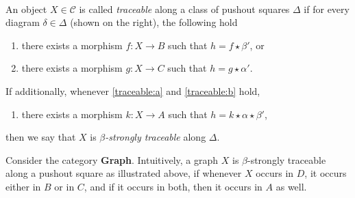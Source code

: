 \begin{definition}
    \label{def:traceability}
    \ \newline
\noindent 
\begin{minipage}{0.5\textwidth}
An object $X \in \mathcal{C}$ is called \emph{traceable} along a class of pushout squares $\Delta$ if for every diagram $\delta \in \Delta$ (shown on the right), the following hold
\end{minipage}
\hfill
\begin{minipage}{0.5\textwidth}
    \hfill
\end{minipage}
    \begin{enumerate}[label=(\alph*)]
        \item\label{traceable:a} there exists a morphism $f : X \to B$ such that $h = f \star \beta'$, or
        \item\label{traceable:b} there exists a morphism $g : X \to C$ such that $h = g \star \alpha'$.
    \end{enumerate}
    If additionally, 
    whenever \ref{traceable:a} and \ref {traceable:b} hold,
    \begin{enumerate}[label=(\alph*),resume]
        \item 
        there exists a morphism $k : X \to A$ such that $h = k \star \alpha \star \beta' $,
    \end{enumerate}
    then we say that $X$ is \emph{$\beta$-strongly traceable} along $\Delta$.
\end{definition}
Consider the category \textbf{Graph}. Intuitively, a graph $X$ is $\beta$-strongly traceable along a pushout square as illustrated above, if whenever $X$ occurs in $D$, it occurs either in $B$ or in $C$, and if it occurs in both, then it occurs in $A$ as well.

